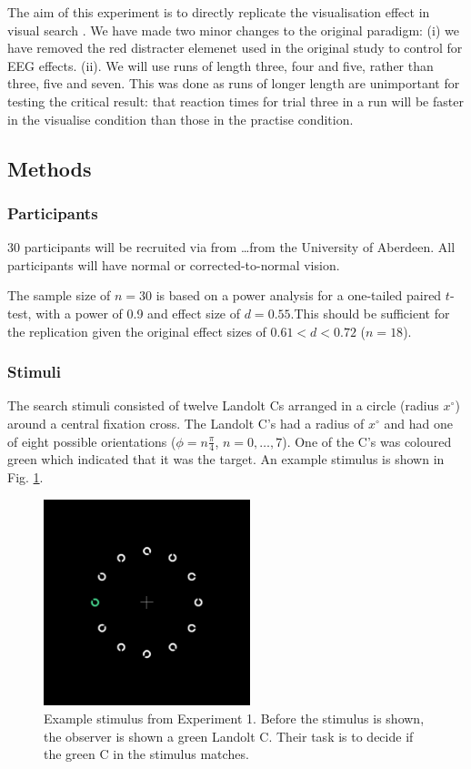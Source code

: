 \documentclass[smallextended]{svjour3}       %
\begin{document}
The aim of this experiment is to directly replicate the visualisation effect in visual search \citep{reinhart2015}. We have made two minor changes to the original paradigm: (i) we have removed the red distracter elemenet used in the original study to control for EEG effects. (ii). We will use runs of length three, four and five, rather than three, five and seven. This was done as runs of longer length are unimportant for testing the critical result: that reaction times for trial three in a run will be faster in the visualise condition than those in the practise condition. 

\subsection{Methods}

\subsubsection{Participants}

30 participants will be recruited via from \ldots from the University of Aberdeen. All participants will have normal or corrected-to-normal vision. 

The sample size of $n=30$ is based on a power analysis for a one-tailed paired $t$-test, with a power of 0.9 and effect size of $d=0.55$.This should be sufficient for the replication given the original effect sizes of $0.61<d<0.72$ ($n=18$).


\subsubsection{Stimuli}

The search stimuli consisted of twelve Landolt Cs arranged in a circle (radius $x^{\circ}$) around a central fixation cross. The Landolt C's had a radius of $x^{\circ}$ and had one of eight possible orientations ($\phi=n\frac{\pi}{4}$, $n=0,\ldots,7$). One of the C's was coloured green which indicated that it was the target. An example stimulus is shown in Fig. \ref{fig:exp1stimulus}.

\begin{figure}
\centering
\includegraphics[width=6cm]{figs/exStimExp1.png}
\caption{Example stimulus from Experiment 1. Before the stimulus is shown, the observer is shown a green Landolt C. Their task is to decide if the green C in the stimulus matches.}
\label{fig:exp1stimulus}
\end{figure}
\end{document}
